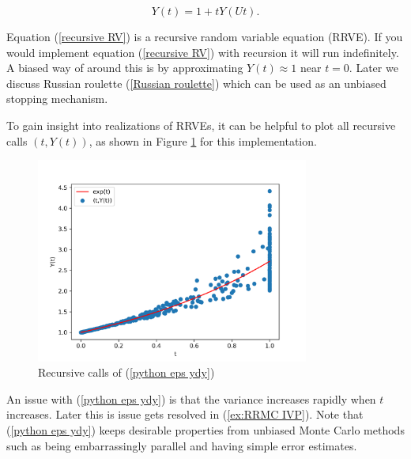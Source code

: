 \documentclass[a4paper,12pt]{article}
\begin{document}
\begin{equation}\label{recursive RV}
    Y(t) = 1 + tY(Ut).
\end{equation}

Equation (\ref{recursive RV}) is a recursive random variable equation (RRVE). If you would implement equation
(\ref{recursive RV}) with recursion it will run indefinitely. A biased way of around this is by approximating
$Y(t) \approx 1$ near $t = 0$. Later we discuss Russian roulette (\ref{Russian roulette}) which
can be used as an unbiased stopping mechanism.

\vspace*{0.2cm}

\begin{pythonn} \label{python eps ydy}
    To gain insight into realizations of RRVEs, it can be helpful to plot
    all recursive calls $(t,Y(t))$, as shown in Figure \ref{fig:intro example}
    for this implementation.

    \begin{figure}[h!]
        \centering
        \includegraphics[width=0.8\textwidth]{plots/intro example.png}
        \caption{Recursive calls of (\ref{python eps ydy})}
        \label{fig:intro example}
    \end{figure}
\end{pythonn}

An issue with (\ref{python eps ydy}) is that the variance increases rapidly when $t$ increases. Later
this is issue gets resolved in (\ref{ex:RRMC IVP}). Note that (\ref{python eps ydy}) keeps desirable properties
from unbiased Monte Carlo methods such as being embarrassingly parallel and
having simple error estimates.
\end{document}

